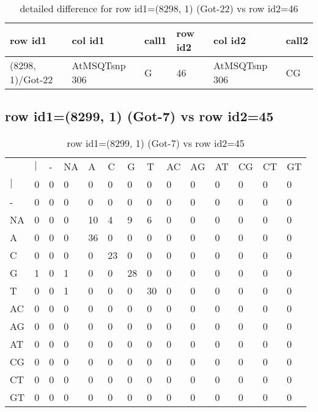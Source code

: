\begin{center}
\begin{longtable}{|l|l|l|l|l|l|}
\caption{detailed difference for row id1=(8298, 1) (Got-22) vs row id2=46} \label{table_dm475}\\
\hline
row id1&col id1&call1&row id2&col id2&call2\\
\hline
(8298, 1)/Got-22&AtMSQTsnp 306&G&46&AtMSQTsnp 306&CG\\
\hline
\end{longtable}
\end{center}

\subsection{row id1=(8299, 1) (Got-7) vs row id2=45}
\begin{center}
\begin{longtable}{|l|l|l|l|l|l|l|l|l|l|l|l|l|l|}
\caption{row id1=(8299, 1) (Got-7) vs row id2=45} \label{table_dm476}\\
\hline
\\
\hline
&$|$&-&NA&A&C&G&T&AC&AG&AT&CG&CT&GT\\
$|$&0&0&0&0&0&0&0&0&0&0&0&0&0\\
-&0&0&0&0&0&0&0&0&0&0&0&0&0\\
NA&0&0&0&10&4&9&6&0&0&0&0&0&0\\
A&0&0&0&36&0&0&0&0&0&0&0&0&0\\
C&0&0&0&0&23&0&0&0&0&0&0&0&0\\
G&1&0&1&0&0&28&0&0&0&0&0&0&0\\
T&0&0&1&0&0&0&30&0&0&0&0&0&0\\
AC&0&0&0&0&0&0&0&0&0&0&0&0&0\\
AG&0&0&0&0&0&0&0&0&0&0&0&0&0\\
AT&0&0&0&0&0&0&0&0&0&0&0&0&0\\
CG&0&0&0&0&0&0&0&0&0&0&0&0&0\\
CT&0&0&0&0&0&0&0&0&0&0&0&0&0\\
GT&0&0&0&0&0&0&0&0&0&0&0&0&0\\
\hline
\end{longtable}
\end{center}

